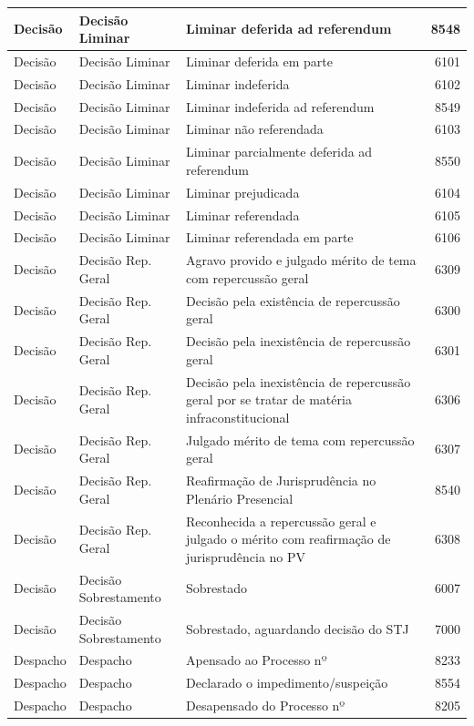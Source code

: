 \documentclass[
]{book}
\begin{document}
\begin{tabular}{l|l|l|r}
\hline
Decisão & Decisão Liminar & Liminar deferida ad referendum & 8548\\
\hline
Decisão & Decisão Liminar & Liminar deferida em parte & 6101\\
\hline
Decisão & Decisão Liminar & Liminar indeferida & 6102\\
\hline
Decisão & Decisão Liminar & Liminar indeferida ad referendum & 8549\\
\hline
Decisão & Decisão Liminar & Liminar não referendada & 6103\\
\hline
Decisão & Decisão Liminar & Liminar parcialmente deferida ad referendum & 8550\\
\hline
Decisão & Decisão Liminar & Liminar prejudicada & 6104\\
\hline
Decisão & Decisão Liminar & Liminar referendada & 6105\\
\hline
Decisão & Decisão Liminar & Liminar referendada em parte & 6106\\
\hline
Decisão & Decisão Rep. Geral & Agravo provido e julgado mérito de tema com repercussão geral & 6309\\
\hline
Decisão & Decisão Rep. Geral & Decisão pela existência de repercussão geral & 6300\\
\hline
Decisão & Decisão Rep. Geral & Decisão pela inexistência de repercussão geral & 6301\\
\hline
Decisão & Decisão Rep. Geral & Decisão pela inexistência de repercussão geral por se tratar de matéria infraconstitucional & 6306\\
\hline
Decisão & Decisão Rep. Geral & Julgado mérito de tema com repercussão geral & 6307\\
\hline
Decisão & Decisão Rep. Geral & Reafirmação de Jurisprudência no Plenário Presencial & 8540\\
\hline
Decisão & Decisão Rep. Geral & Reconhecida a repercussão geral e julgado o mérito com reafirmação de jurisprudência no PV & 6308\\
\hline
Decisão & Decisão Sobrestamento & Sobrestado & 6007\\
\hline
Decisão & Decisão Sobrestamento & Sobrestado, aguardando decisão do STJ & 7000\\
\hline
Despacho & Despacho & Apensado ao Processo nº & 8233\\
\hline
Despacho & Despacho & Declarado o impedimento/suspeição & 8554\\
\hline
Despacho & Despacho & Desapensado do Processo nº & 8205\\
\hline

\end{tabular}
\end{document}
